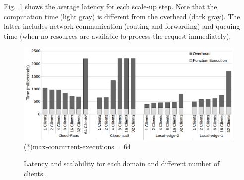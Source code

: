 




Fig.~\ref{fig:latency-domains} shows the average latency for each scale-up step. Note that the computation time (light gray) is different from the overhead (dark gray). The latter includes network communication (routing and forwarding) and queuing time (when no resources are available to process the request immediately). 

\begin{figure}
	
	\centering
	\includegraphics[width=.9\textwidth]{figs/latency-domain-new}
	\scriptsize{(*)max-concurrent-executions = 64}
	\vspace{-.3cm}
	\caption{Latency and scalability for each domain and different number of clients.}
	\label{fig:latency-domains}
\end{figure}

